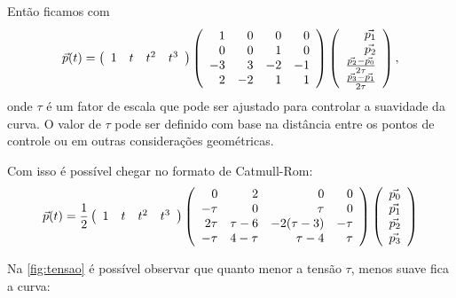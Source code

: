 Então ficamos com
\begin{equation}
    {\vec{p}}(t) =  
        \left(
        \begin{array}{rrrr}
            1 & t & t^2 & t^3
        \end{array}
        \right)
        \left(
        \begin{array}{rrrr}
            1 & 0 & 0 & 0 \\
            0 & 0 & 1 & 0 \\
            -3 & 3 & -2 & -1 \\
                2 & -2 & 1 & 1
        \end{array}
        \right)
    \left(
        \begin{array}{r}
            {\vec{p_1}} \\
            {\vec{p_2}} \\
            \frac{{\vec{p_2}} - {\vec{p_0}}}{2\tau} \\
                \frac{{\vec{p_3}} - {\vec{p_1}}}{2\tau}
        \end{array}
        \right),
\end{equation}
onde $\tau$ é um fator de escala que pode ser ajustado para controlar a suavidade da curva. O valor de $\tau$ pode ser definido com base na distância entre os pontos de controle ou em outras considerações geométricas.

Com isso é possível chegar no formato de Catmull-Rom:
\begin{equation}
    {\vec{p}}(t) = \frac{1}{2}
       \left(
 	\begin{array}{rrrr}
 		1 & t & t^2 & t^3
 	\end{array}
    \right)
    \left(
 	\begin{array}{rrrr}
 		0 & 2 & 0 & 0 \\
 	    -\tau & 0 & \tau & 0 \\
 		2\tau & \tau-6 & -2(\tau-3) & -\tau \\
            -\tau & 4-\tau & \tau-4 & \tau
 	\end{array}
    \right)
   \left(
 	\begin{array}{r}
 		{\vec{p_0}} \\
 	    {\vec{p_1}} \\
 		{\vec{p_2}} \\
            {\vec{p_3}}
 	\end{array}
    \right)
\end{equation}

Na \autoref{fig:tensao} é possível observar que quanto menor a tensão $\tau$, menos suave fica a curva:


